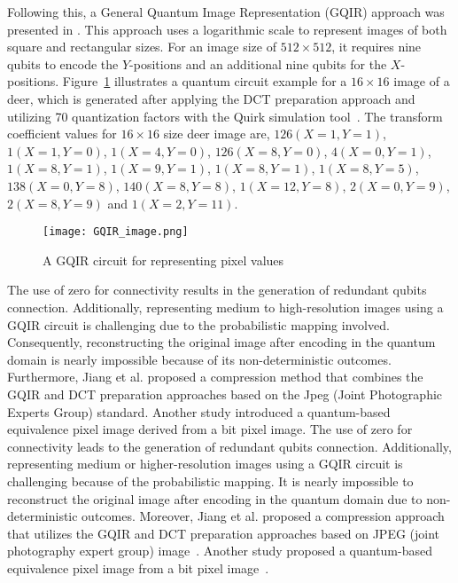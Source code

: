 Following this, a General Quantum Image Representation (GQIR) approach was presented in \cite{b18}. This approach uses a logarithmic scale to represent images of both square and rectangular sizes. For an image size of $512 \times 512$, it requires nine qubits to encode the $Y$-positions and an additional nine qubits for the $X$-positions. Figure~\ref{GQIR_Circuit} illustrates a quantum circuit example for a $16 \times 16$ image of a deer, which is generated after applying the DCT preparation approach and utilizing 70 quantization factors with the Quirk simulation tool~\cite{bb17}. The transform coefficient values for $16\times 16$ size deer image  are, $126(X = 1, Y = 1)$, $1(X = 1, Y = 0)$, $1(X = 4, Y = 0)$, $126(X = 8, Y = 0)$, $4(X = 0, Y = 1)$, $1(X = 8, Y = 1)$, $1(X = 9, Y = 1)$, $1(X = 8, Y = 1)$, $1(X = 8, Y = 5)$, $138(X = 0, Y = 8)$, $140(X = 8, Y = 8)$, $1(X = 12, Y = 8)$, $2(X = 0, Y = 9)$, $2(X = 8, Y = 9)$ and $1(X = 2, Y = 11)$. 

\begin{figure*}[htbp]
\centerline{\texttt{[image: GQIR\_image.png]}}
\caption{A GQIR circuit for representing pixel values}
\label{GQIR_Circuit}
\end{figure*}

The use of zero for connectivity results in the generation of redundant qubits connection. Additionally, representing medium to high-resolution images using a GQIR circuit is challenging due to the probabilistic mapping involved. Consequently, reconstructing the original image after encoding in the quantum domain is nearly impossible because of its non-deterministic outcomes. Furthermore, Jiang et al. proposed a compression method that combines the GQIR and DCT preparation approaches based on the Jpeg (Joint Photographic Experts Group) standard. Another study introduced a quantum-based equivalence pixel image derived from a bit pixel image. The use of zero for connectivity leads to the generation of redundant qubits connection. Additionally, representing medium or higher-resolution images using a GQIR circuit is challenging because of the probabilistic mapping. It is nearly impossible to reconstruct the original image after encoding in the quantum domain due to non-deterministic outcomes. Moreover, Jiang et al. proposed a compression approach that utilizes the GQIR and DCT preparation approaches based on JPEG (joint photography expert group) image~\cite{pm}. Another study proposed a quantum-based equivalence pixel image from a bit pixel image~\cite{b15}.

